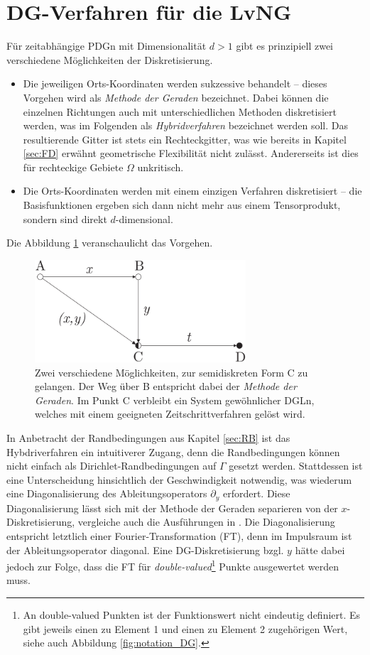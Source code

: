 \section{DG-Verfahren für die LvNG}\label{sec:primal}
Für zeitabhängige PDGn mit Dimensionalität $d>1$ gibt es prinzipiell zwei verschiedene Möglichkeiten der Diskretisierung.
\begin{itemize}
  \item Die jeweiligen Orts-Koordinaten werden sukzessive behandelt -- dieses Vorgehen wird als \emph{Methode der Geraden} bezeichnet. Dabei können die einzelnen Richtungen auch mit unterschiedlichen Methoden diskretisiert werden, was im Folgenden als \emph{Hybridverfahren} bezeichnet werden soll. Das resultierende Gitter ist stets ein Rechteckgitter, was wie bereits in Kapitel \ref{sec:FD} erwähnt geometrische Flexibilität nicht zulässt. Andererseits ist dies für rechteckige Gebiete $\Omega$ unkritisch.
  \item Die Orts-Koordinaten werden mit einem einzigen Verfahren diskretisiert -- die Basisfunktionen ergeben sich dann nicht mehr aus einem Tensorprodukt, sondern sind direkt $d$-dimensional.
\end{itemize}
Die Abbildung \ref{fig:methodeDerGeraden} veranschaulicht das Vorgehen.
\begin{figure}
  \centering
  \includegraphics[width=0.7\textwidth]{files/methodeDerGeraden.pdf}
  \caption{Zwei verschiedene Möglichkeiten, zur semidiskreten Form C zu gelangen. Der Weg über B entspricht dabei der \emph{Methode der Geraden}. Im Punkt C verbleibt ein System gewöhnlicher DGLn, welches mit einem geeigneten Zeitschrittverfahren gelöst wird.}
  \label{fig:methodeDerGeraden}
\end{figure}
In Anbetracht der Randbedingungen aus Kapitel \ref{sec:RB} ist das Hybdriverfahren ein intuitiverer Zugang, denn die Randbedingungen können nicht einfach als Dirichlet-Randbedingungen auf $\Gamma$ gesetzt werden. Stattdessen ist eine Unterscheidung hinsichtlich der Geschwindigkeit notwendig, was wiederum eine Diagonalisierung des Ableitungsoperators $\partial_y$ erfordert. Diese Diagonalisierung lässt sich mit der Methode der Geraden separieren von der $x$-Diskretisierung, vergleiche auch die Ausführungen in \cite{lukas1}. Die Diagonalisierung entspricht letztlich einer Fourier-Transformation (FT), denn im Impulsraum ist der Ableitungsoperator  diagonal. Eine DG-Diskretisierung bzgl. $y$ hätte dabei jedoch zur Folge, dass die FT für \emph{double-valued}\footnote{An double-valued Punkten ist der Funktionswert nicht eindeutig definiert. Es gibt jeweils einen zu Element 1 und einen zu Element 2 zugehörigen Wert, siehe auch Abbildung \ref{fig:notation_DG}.} Punkte ausgewertet werden muss.

